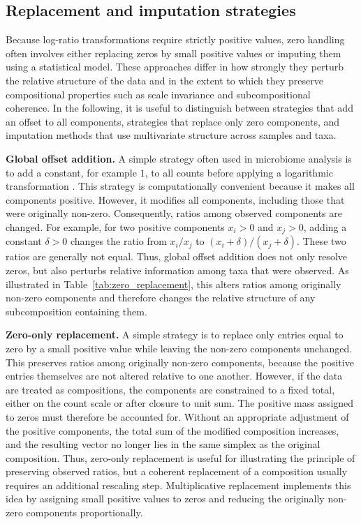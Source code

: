 \subsection{Replacement and imputation strategies}
\label{sec:2micro:zeros:replacement}

Because log-ratio transformations require strictly positive values, zero handling often involves either replacing zeros by small positive values or imputing them using a statistical model. 
These approaches differ in how strongly they perturb the relative structure of the data and in the extent to which they preserve compositional properties such as scale invariance and subcompositional coherence. In the following, it is useful to distinguish between strategies that add an offset to all components, strategies that replace only zero components, and imputation methods that use multivariate structure across samples and taxa.

\noindent\textbf{Global offset addition.}
A simple strategy often used in microbiome analysis is to add a constant, for example $1$, to all counts before applying a logarithmic transformation \citep{mcmurdie2013phyloseq,weiss2017normalization}. This strategy is computationally convenient because it makes all components positive. However, it modifies all components, including those that were originally non-zero. Consequently, ratios among observed components are changed. For example, for two positive components $x_i>0$ and $x_j>0$, adding a constant $\delta>0$ changes the ratio from
$x_i/x_j$ to $(x_i+\delta)/(x_j+\delta)$.
These two ratios are generally not equal. Thus, global offset addition does not only resolve zeros, but also perturbs relative information among taxa that were observed. As illustrated in Table~\ref{tab:zero_replacement}, this alters ratios among originally non-zero components and therefore changes the relative structure of any subcomposition containing them.

\noindent\textbf{Zero-only replacement.}
A simple strategy is to replace only entries equal to zero by a small positive value while leaving the non-zero components unchanged. This preserves ratios among originally non-zero components, because the positive entries themselves are not altered relative to one another. However, if the data are treated as compositions, the components are constrained to a fixed total, either on the count scale or after closure to unit sum. The positive mass assigned to zeros must therefore be accounted for. Without an appropriate adjustment of the positive components, the total sum of the modified composition increases, and the resulting vector no longer lies in the same simplex as the original composition. Thus, zero-only replacement is useful for illustrating the principle of preserving observed ratios, but a coherent replacement of a composition usually requires an additional rescaling step. Multiplicative replacement implements this idea by assigning small positive values to zeros and reducing the originally non-zero components proportionally.

